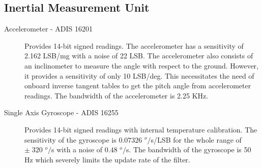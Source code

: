 \subsection*{Inertial Measurement Unit}
\begin{description}
  \item[\textsf{Accelerometer - ADIS 16201}]
  Provides 14-bit signed readings. The accelerometer has a sensitivity of 2.162 LSB/mg with a noise of 22 
  LSB. The accelerometer also consists of an inclinometer to measure the angle with respect to the ground. 
  However, it provides a sensitivity of only 10 LSB/deg. This necessitates the need of onboard inverse 
  tangent tables to get the pitch angle from accelerometer readings. The bandwidth of the accelerometer is 
  2.25 KHz.
  \item[\textsf{Single Axis Gyroscope - ADIS 16255}]
  Provides 14-bit signed readings with internal temperature calibration. The sensitivity of the gyroscope 
  is $0.07326$ $^o/$s/LSB for the whole range of $\pm\;320$ $^o/$s with a noise of $0.48$ $^o/$s.  The 
  bandwidth of the gyroscope is 50 Hz which severely limits the update rate of the filter.
\end{description}

